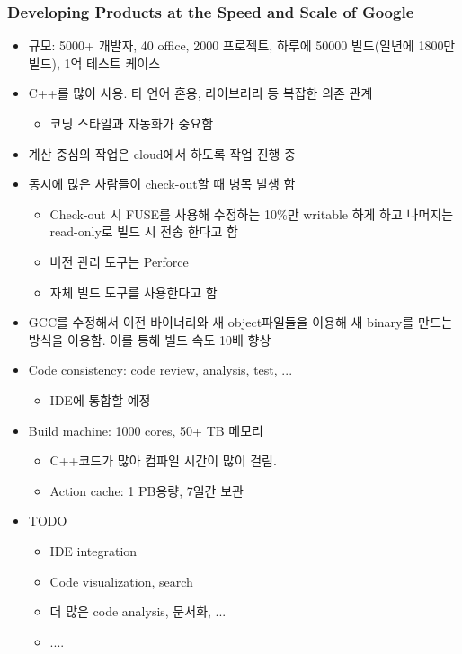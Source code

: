 \begin{frame}[allowframebreaks]
\frametitle{Developing Products at the Speed and Scale of Google}

\begin{itemize}

\item 규모: 5000+ 개발자, 40 office, 2000 프로젝트, 하루에 50000 빌드(일년에 1800만 빌드), 1억  테스트 케이스

\item C++를 많이 사용. 타 언어 혼용, 라이브러리 등 복잡한 의존 관계
    \begin{itemize}
    \item 코딩 스타일과 자동화가 중요함
    \end{itemize}

\item 계산 중심의 작업은 cloud에서 하도록 작업 진행 중

\item 동시에 많은 사람들이 check-out할 때 병목 발생 함
    \begin{itemize}
    \item Check-out 시 FUSE를 사용해 수정하는 10\%만 writable 하게 하고 나머지는 read-only로 빌드 시 전송 한다고 함
    \item 버전 관리 도구는 Perforce
    \item 자체 빌드 도구를 사용한다고 함
    \end{itemize}
\item GCC를 수정해서  이전 바이너리와 새 object파일들을 이용해 새 binary를 만드는 방식을 이용함. 이를 통해 빌드 속도 10배 향상

\item Code consistency: code review, analysis, test, ...
    \begin{itemize}
    \item IDE에 통합할 예정
    \end{itemize}

\item Build machine: 1000 cores, 50+ TB 메모리
    \begin{itemize}
    \item C++코드가 많아 컴파일 시간이 많이 걸림.
    \item Action cache: 1 PB용량, 7일간 보관
    \end{itemize}

\item TODO
    \begin{itemize}
    \item IDE integration 
    \item Code  visualization, search
    \item 더 많은 code analysis, 문서화, ...
    \item .... 
    \end{itemize}
\end{itemize}

\end{frame}
